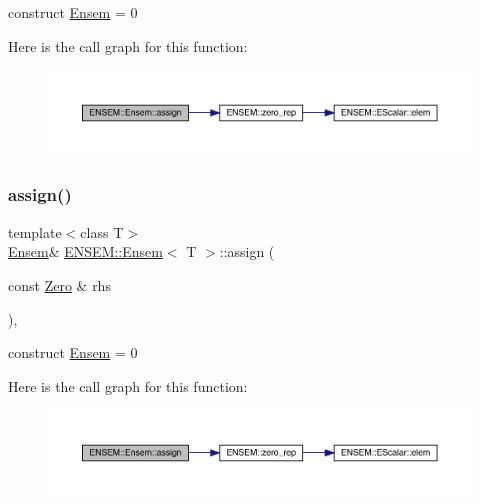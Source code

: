 construct \mbox{\hyperlink{classENSEM_1_1Ensem}{Ensem}} = 0 

Here is the call graph for this function\+:
\nopagebreak
\begin{figure}[H]
\begin{center}
\leavevmode
\includegraphics[width=350pt]{d7/d3e/classENSEM_1_1Ensem_a140d8bb94d07a0abfb2ad396df63c625_cgraph}
\end{center}
\end{figure}
\mbox{\label{classENSEM_1_1Ensem_a140d8bb94d07a0abfb2ad396df63c625}} 
\subsubsection{\texorpdfstring{assign()}{assign()}\hspace{0.1cm}{\footnotesize\ttfamily [12/12]}}
{\footnotesize\ttfamily template$<$class T$>$ \\
\mbox{\hyperlink{classENSEM_1_1Ensem}{Ensem}}\& \mbox{\hyperlink{classENSEM_1_1Ensem}{E\+N\+S\+E\+M\+::\+Ensem}}$<$ T $>$\+::assign (\begin{DoxyParamCaption}\item[{const \mbox{\hyperlink{structENSEM_1_1Zero}{Zero}} \&}]{rhs }\end{DoxyParamCaption})\hspace{0.3cm}{\ttfamily [inline]}, {\ttfamily [protected]}}



construct \mbox{\hyperlink{classENSEM_1_1Ensem}{Ensem}} = 0 

Here is the call graph for this function\+:
\nopagebreak
\begin{figure}[H]
\begin{center}
\leavevmode
\includegraphics[width=350pt]{d7/d3e/classENSEM_1_1Ensem_a140d8bb94d07a0abfb2ad396df63c625_cgraph}
\end{center}
\end{figure}
\mbox{\label{classENSEM_1_1Ensem_a1cebe5f8cc3d849d6b4dc7d9d10c636b}} 
